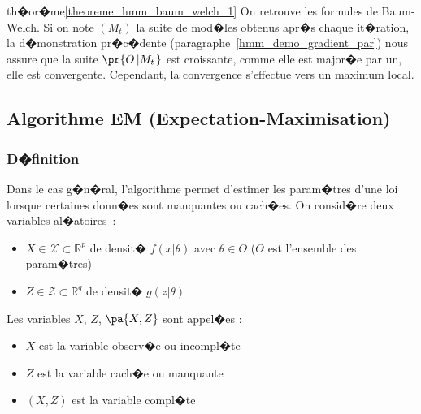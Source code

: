 \begin{xdemo}{th�or�me}{\ref{theoreme_hmm_baum_welch_1}}
On retrouve les formules de Baum-Welch. Si on note $\left(  M_{t}\right)  $ la suite de mod�les obtenus apr�s chaque it�ration, la d�monstration pr�c�dente (paragraphe~\ref{hmm_demo_gradient_par}) nous assure que la suite $\pr{  O\left| M_{t}\right.  }  $ est croissante, comme elle est major�e par un, elle est convergente. Cependant, la convergence s'effectue vers un maximum local.

\end{xdemo}





















\subsection{Algorithme EM (Expectation-Maximisation)}
\label{hmm_algo_em_sec_new}


\subsubsection{D�finition}

Dans le cas g�n�ral, l'algorithme permet d'estimer les param�tres d'une loi lorsque certaines donn�es sont manquantes ou cach�es. On consid�re deux variables al�atoires~:

\begin{itemize}
\item $X\in\mathcal{X}\subset \mathbb{R}^p$ de densit� $f\left(  x\left|  \theta\right.  \right)  $ avec $\theta\in\Theta$ ($\Theta$ est l'ensemble des param�tres) 
\item $Z\in\mathcal{Z}\subset\mathbb{R}^{q}$ de densit� $g\left(  z\left|  \theta\right.  \right)  $
\end{itemize}


Les variables $X$, $Z$, $\pa{X,Z}$ sont appel�es :


\begin{itemize}
\item $X$ est la variable observ�e ou incompl�te
\item $Z$ est la variable cach�e ou manquante
\item $\left( X,Z\right) $ est la variable compl�te
\end{itemize}

